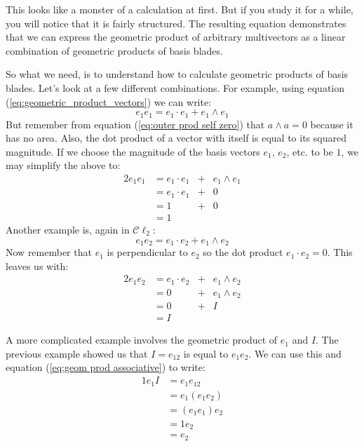 \documentclass[10pt]{report}
\begin{document}
This looks like a monster of a calculation at first. But if you
study it for a while, you will notice that it is fairly
structured. The resulting equation demonstrates that we can
express the geometric product of arbitrary multivectors as a
linear combination of geometric products of basis blades.

So what we need, is to understand how to calculate geometric
products of basis blades. Let's look at a few different
combinations. For example, using equation
(\ref{eq:geometric_product_vectors}) we can write:
\begin{displaymath}
  e_1e_1 = e_1\cdot e_1 + e_1\wedge e_1
\end{displaymath}
But remember from equation (\ref{eq:outer prod self zero}) that $a
\wedge a = 0$ because it has no area. Also, the dot product of a
vector with itself is equal to its squared magnitude. If we choose
the magnitude of the basis vectors $e_1$, $e_2$, etc. to be $1$,
we may simplify the above to:
\begin{alignat}{2}
  e_1e_1 &= e_1\cdot e_1 &+& e_1\wedge e_1   \nonumber \\
         &= e_1\cdot e_1 &+& 0               \nonumber \\
         &= 1 &+& 0                          \nonumber \\
         &= 1 &                              \nonumber
\end{alignat}
Another example is, again in $\mathcal{C}\ell_2$:
\begin{displaymath}
    e_1e_2 = e_1\cdot e_2 + e_1\wedge e_2
\end{displaymath}
Now remember that $e_1$ is perpendicular to $e_2$ so the dot
product $e_1 \cdot e_2 = 0$. This leaves us with:
\begin{alignat}{2}
  e_1e_2 &= e_1\cdot e_2 &+& e_1\wedge e_2   \nonumber \\
         &= 0 &+& e_1\wedge e_2              \nonumber \\
         &= 0 &+& I                          \nonumber \\
         &= I &                              \nonumber
\end{alignat}

A more complicated example involves the geometric product of
$e_{1}$ and $I$. The previous example showed us that $I = e_{12}$
is equal to $e_1e_2$. We can use this and equation (\ref{eq:geom
prod associative}) to write:
\begin{alignat}{1}
    e_1I &= e_1e_{12}                       \nonumber \\
         &= e_1(e_1e_2)                     \nonumber \\
         &= (e_1e_1)e_2                     \nonumber \\
         &= 1e_2                            \nonumber \\
         &= e_2                             \nonumber
\end{alignat}
\end{document}
